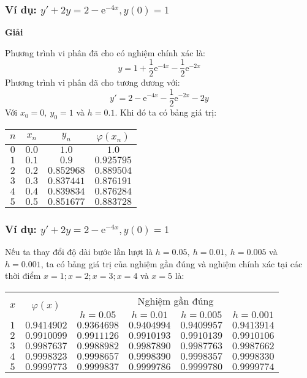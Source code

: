 \begin{frame}\small
	\frametitle{Ví dụ: $y'+2y=2-{\mathrm{e}^{-4x}},y(0)=1$}
	\textbf{Giải}\par
	Phương trình vi phân đã cho có nghiệm chính xác là:
	$$y=1+\frac{1}{2}{\mathrm{e}^{-4x}}-\frac{1}{2}{\mathrm{e}^{-2x}}$$
	Phương trình vi phân đã cho tương đương với: $$y'=2-\mathrm{e}^{-4x}-\frac12\mathrm{e}^{-2x}-2y$$
	Với $x_0=0,~y_0=1$ và $h=0.1$. Khi đó ta có bảng giá trị:
	\begin{center}\begin{tabular}{|c|c|c|c|}\hline
		$n$ & $x_n$ & $y_n$      & $\varphi(x_n)$ \\\hline
		$0$ & $0.0$ & $1.0$      & $1.0$      \\\hline
		$1$ & $0.1$ & $0.9$      & $0.925795$ \\\hline
		$2$ & $0.2$ & $0.852968$ & $0.889504$ \\\hline
		$3$ & $0.3$ & $0.837441$ & $0.876191$ \\\hline
		$4$ & $0.4$ & $0.839834$ & $0.876284$ \\\hline
		$5$ & $0.5$ & $0.851677$ & $0.883728$ \\\hline
	\end{tabular}\end{center}
\end{frame}
\begin{frame}
	\frametitle{Ví dụ: $y'+2y=2-{\mathrm{e}^{-4x}},y(0)=1$}
	Nếu ta thay đổi độ dài bước lần lượt là $h=0.05,~h=0.01,~h=0.005$ và $h=0.001$, ta có bảng giá trị của nghiệm gần đúng và nghiệm chính xác tại các thời điểm $x=1;x=2;x=3;x=4$ và $x=5$ là:
	\begin{table}\small
		\begin{tabular}{|c|c|c|c|c|c|}\hline
			\multirow{2}{*}{$x$} & \multirow{2}{*}{$\varphi(x)$} & \multicolumn{4}{c|}{Nghiệm gần đúng}\\\cline{3-6}
			&&$h=0.05$&$h=0.01$&$h=0.005$&$h=0.001$\\\hline
			$1$&$0.9414902$&$0.9364698$&$0.9404994$&$0.9409957$&$0.9413914$\\\hline
			$2$&$0.9910099$&$0.9911126$&$0.9910193$&$0.9910139$&$0.9910106$\\\hline
			$3$&$0.9987637$&$0.9988982$&$0.9987890$&$0.9987763$&$0.9987662$\\\hline
			$4$&$0.9998323$&$0.9998657$&$0.9998390$&$0.9998357$&$0.9998330$\\\hline
			$5$&$0.9999773$&$0.9999837$&$0.9999786$&$0.9999780$&$0.9999774$\\\hline
		\end{tabular}
	\end{table}
\end{frame}
